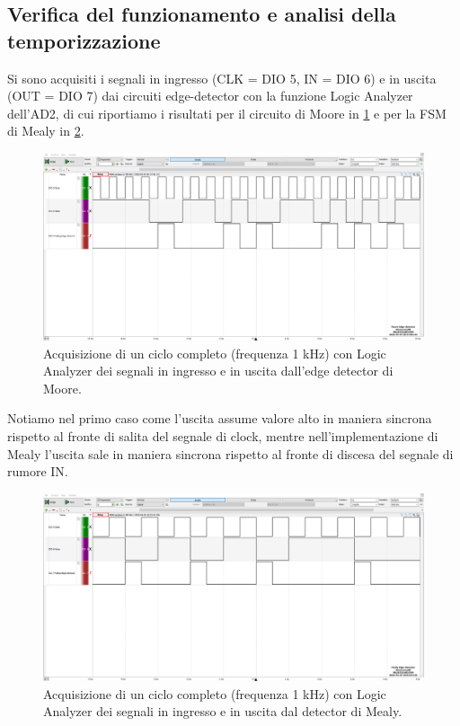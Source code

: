 \documentclass[10pt, a4paper, italian]{article}
\begin{document}
\subsection{Verifica del funzionamento e analisi della temporizzazione}
Si sono acquisiti i segnali in ingresso (CLK = DIO 5, IN = DIO 6) e in uscita
(OUT = DIO 7) dai circuiti edge-detector con la funzione Logic Analyzer
dell'AD2, di cui riportiamo i risultati per il circuito di Moore in
\cref{fig: edgeMoore} e per la FSM di Mealy in \cref{fig: edgeMealy}.
\begin{figure}[htbp]
    \centering
    \includegraphics[width=\textwidth]{Moore_edge_detector}
    \caption{Acquisizione di un ciclo completo (frequenza 1 kHz) con Logic
    Analyzer dei segnali in ingresso e in uscita dall'edge detector di Moore.
    \label{fig: edgeMoore}}
\end{figure}

Notiamo nel primo caso come l'uscita assume valore alto in maniera sincrona
rispetto al fronte di salita del segnale di clock, mentre nell'implementazione
di Mealy l'uscita sale in maniera sincrona rispetto al fronte di discesa del
segnale di rumore IN.
\begin{figure}[htbp]
    \centering
    \includegraphics[width=\textwidth]{Mealy_edge_detector}
    \caption{Acquisizione di un ciclo completo (frequenza 1 kHz) con Logic
    Analyzer dei segnali in ingresso e in uscita dal detector di Mealy.
    \label{fig: edgeMealy}}
\end{figure}
\end{document}

